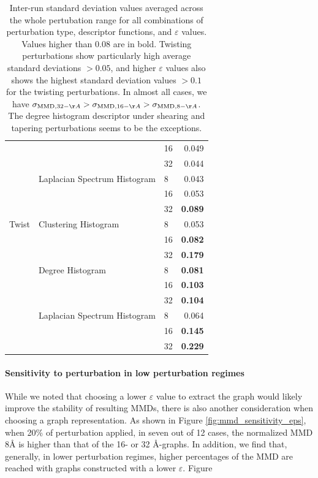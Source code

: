 \begin{table}
{\begin{tabular}{lllr}
    &                              & 16 &           0.049 \\
    &                              & 32 &           0.044 \\
    & Laplacian Spectrum Histogram & 8  &           0.043 \\
    &                              & 16 &           0.053 \\
    &                              & 32 &           \textbf{0.089} \\
    Twist & Clustering Histogram & 8  &           0.053 \\
    &                              & 16 &           \textbf{0.082} \\
    &                              & 32 &           \textbf{0.179} \\
    & Degree Histogram & 8  &           \textbf{0.081} \\
    &                              & 16 &           \textbf{0.103} \\
    &                              & 32 &           \textbf{0.104} \\
    & Laplacian Spectrum Histogram & 8  &           0.064 \\
    &                              & 16 &           \textbf{0.145} \\
    &                              & 32 &           \textbf{0.229} \\
    \bottomrule
  \end{tabular}
}
\caption[Inter-run standard deviation values averaged across the whole
pertubation range for all combinations of perturbation type, descriptor
functions, and $\varepsilon$ values.]{Inter-run standard deviation values
averaged across the whole pertubation range for all combinations of perturbation
type, descriptor functions, and $\varepsilon$ values. Values higher than $0.08$
are in bold. Twisting perturbations show particularly high average standard
deviations $>0.05$, and higher $\varepsilon$ values also shows the highest
standard deviation values $>0.1$ for the twisting perturbations. In almost all
cases, we have $\sigma_{\MMD, 32-\AA}>\sigma_{\MMD, 16-\AA}>\sigma_{\MMD,
8-\AA}$. The degree histogram descriptor under shearing and tapering
perturbations seems to be the exceptions.}
  \label{tab:std_dev_epsilon_influence}
\end{table}


\paragraph{Sensitivity to perturbation in low perturbation regimes} While we
noted that choosing a lower $\varepsilon$ value to extract the graph would
likely improve the stability of resulting MMDs, there is also another
consideration when choosing a graph representation. As shown in Figure
\ref{fig:mmd_sensitivity_eps}, when 20\% of perturbation applied, in seven out
of 12 cases, the normalized MMD 8\si{\angstrom} is higher than that of the 16-
or 32 \si{\angstrom}-graphs. In addition, we find that, generally, in lower
perturbation regimes, higher percentages of the MMD are reached with graphs
constructed with a lower $\varepsilon$. Figure

